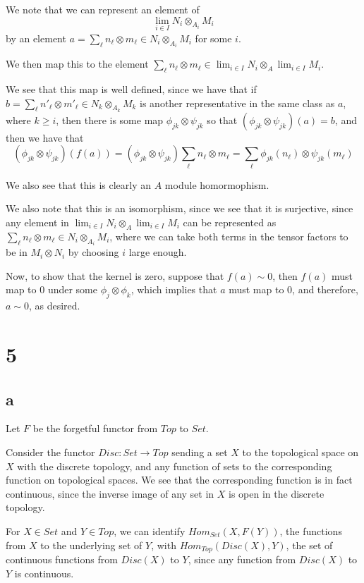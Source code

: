 \documentclass[a4paper]{article}
\theoremstyle{named}
\let\tempa\section
\renewcommand{\section}[1]{\tempa*{#1}}
\let\tempb\subsection
\renewcommand{\subsection}[1]{\tempb*{#1}}
\begin{document}
We note that we can represent an element of
\[
\lim_{i \in I} N_{i} \otimes_{A_i} M_i
\]
by an element $a = \sum_{\ell } n_{\ell} \otimes m_{\ell} \in N_{i} \otimes_{A_i} M_i$ for some $i$.

We then map this to the element $\sum_{\ell } n_{\ell} \otimes m_{\ell} \in \lim_{i \in I} N_{i} \otimes_A \lim_{i \in I} M_i$. 

We see that this map is well defined, since we have that if $b = \sum_{\ell } n'_{\ell} \otimes m'_{\ell} \in N_{k} \otimes_{A_k} M_k$ is another representative in the same class as $a$, where $k \ge i$, then there is some map $\phi_{jk} \otimes \psi_{jk}$ so that $(\phi_{jk} \otimes \psi_{jk})(a) = b$, and then we have that
\[
   (\phi_{jk} \otimes \psi_{jk})(f(a)) = (\phi_{jk} \otimes \psi_{jk}) \sum_{\ell } n_{\ell} \otimes m_{\ell}
   =\sum_{\ell } \phi_{jk} (n_{\ell}) \otimes \psi_{jk}(m_{\ell} )
\]

We also see that this is clearly an $A$ module homormophism.

We also note that this is an isomorphism, since we see that it is surjective, since any element in $\lim_{i \in I} N_{i} \otimes_A \lim_{i \in I} M_i$ can be represented as $\sum_{\ell } n_{\ell} \otimes m_{\ell} \in N_{i} \otimes_{A_i} M_i$, where we can take both terms in the tensor factors to be in $M_i \otimes N_i$ by choosing $i$ large enough.


Now, to show that the kernel is zero, suppose that $f(a) \sim 0$, then $f(a)$ must map to 0 under some $\phi_{j}\otimes \phi_k$, which implies that $a$ must map to 0, and therefore, $a \sim 0$, as desired.

\section{5}
\subsection{a}
Let $F$ be the forgetful functor from $Top$ to $Set$.

Consider the functor $Disc:Set \rightarrow Top$ sending a set $X$ to the topological space on $X$ with the discrete topology, and any function of sets to the corresponding function on topological spaces. We see that the corresponding function is in fact continuous, since the inverse image of any set in $X$ is open in the discrete topology.

For $X \in Set$ and $Y \in Top$, we can identify $Hom_{Set}(X, F(Y))$, the functions from $X$ to the underlying set of $Y$, with $Hom_{Top}(Disc(X), Y)$, the set of continuous functions from $Disc(X)$ to $Y$, since any function from $Disc(X)$ to $Y$ is continuous.
\end{document}
